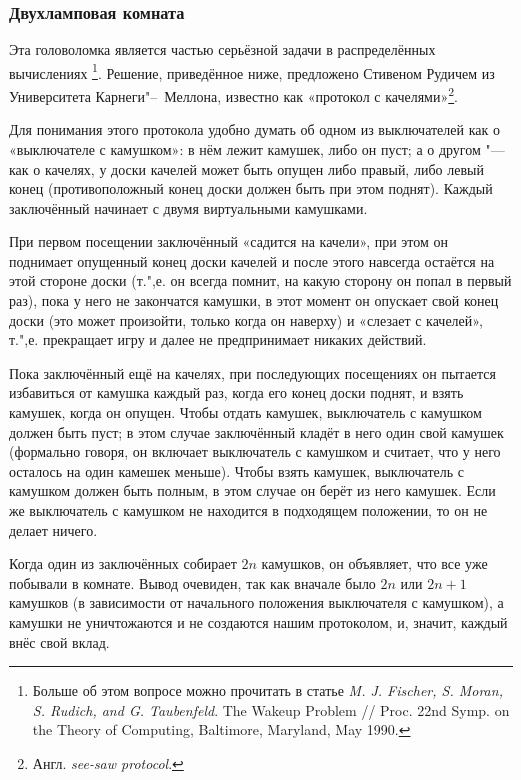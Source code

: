 \documentclass[twoside]{book}
\begin{document}
\subsubsection*{Двухламповая комната}

Эта головоломка является частью серьёзной задачи в распределённых вычислениях%
\footnote{Больше об этом вопросе можно прочитать в статье \emph{M. J. Fischer, S. Moran, S. Rudich, and G. Taubenfeld}. The Wakeup Problem /\!/ {Proc. 22nd Symp. on the Theory of Computing}, Baltimore, Maryland, May 1990.}.
Решение, приведённое ниже, предложено Стивеном Рудичем из Университета Карнеги"--~Меллона, известно как «протокол с качелями»\footnote{Англ. \emph{see-saw protocol}.}.


Для понимания этого протокола удобно думать об одном из выключателей как о «выключателе с камушком»:  в нём лежит камушек, либо он пуст; а о другом "--- как о качелях, у доски качелей может быть опущен либо правый, либо  левый конец (противоположный конец доски должен быть при этом поднят).
Каждый заключённый начинает с двумя виртуальными камушками.

При первом посещении заключённый «садится на качели», при этом он поднимает опущенный конец доски качелей и
после этого навсегда остаётся на этой стороне доски (т.",е. он всегда помнит, на какую сторону он попал в первый раз), пока у него не закончатся камушки, в этот момент он опускает свой конец доски (это может произойти, только когда он наверху) и «слезает с качелей», т.",е. прекращает игру и далее не предпринимает никаких действий.

Пока заключённый ещё на качелях,
при последующих посещениях он пытается избавиться от камушка каждый раз, когда его конец доски поднят,
и взять камушек, когда он опущен.
Чтобы  отдать камушек, выключатель с камушком должен быть пуст;
в этом случае заключённый 
кладёт в него один свой камушек (формально говоря, он включает выключатель с камушком и считает, что у него осталось на один камешек меньше).
Чтобы  взять камушек, выключатель с камушком должен быть полным, в этом случае он берёт из него камушек.
Если же выключатель с камушком не находится в подходящем положении, то он не делает ничего.

Когда один из заключённых собирает $2n$ камушков, он объявляет, что все уже побывали в комнате.
Вывод очевиден, так как в\change{ }{}начале было $2n$ или $2n+1$ камушков (в зависимости от начального положения выключателя с камушком), а камушки не уничтожаются и не создаются нашим протоколом, и, значит, каждый внёс свой вклад.
\end{document}
